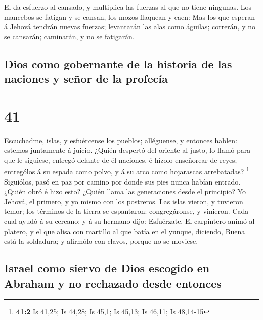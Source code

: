  El da esfuerzo al cansado, y multiplica las fuerzas al que
no tiene ningunas.  Los mancebos se fatigan y se cansan,
los mozos flaquean y caen:  Mas los que esperan á Jehová
tendrán nuevas fuerzas; levantarán las alas como águilas; correrán, y no
se cansarán; caminarán, y no se fatigarán.

\hypertarget{dios-como-gobernante-de-la-historia-de-las-naciones-y-seuxf1or-de-la-profecuxeda}{%
\subsection{Dios como gobernante de la historia de las naciones y señor
de la
profecía}\label{dios-como-gobernante-de-la-historia-de-las-naciones-y-seuxf1or-de-la-profecuxeda}}

\hypertarget{section-40}{%
\section{41}\label{section-40}}

 Escuchadme, islas, y esfuércense los pueblos; alléguense, y
entonces hablen: estemos juntamente á juicio.  ¿Quién
despertó del oriente al justo, lo llamó para que le siguiese, entregó
delante de él naciones, é hízolo enseñorear de reyes; entrególos á su
espada como polvo, y á su arco como hojarascas arrebatadas? \footnote{\textbf{41:2}
  Is 41,25; Is 44,28; Is 45,1; Is 45,13; Is 46,11; Is 48,14-15}
 Siguiólos, pasó en paz por camino por donde sus pies nunca
habían entrado.  ¿Quién obró é hizo esto? ¿Quién llama las
generaciones desde el principio? Yo Jehová, el primero, y yo mismo con
los postreros.  Las islas vieron, y tuvieron temor; los
términos de la tierra se espantaron: congregáronse, y vinieron.
 Cada cual ayudó á su cercano; y á su hermano dijo:
Esfuérzate.  El carpintero animó al platero, y el que alisa
con martillo al que batía en el yunque, diciendo, Buena está la
soldadura; y afirmólo con clavos, porque no se moviese.

\hypertarget{israel-como-siervo-de-dios-escogido-en-abraham-y-no-rechazado-desde-entonces}{%
\subsection{Israel como siervo de Dios escogido en Abraham y no
rechazado desde
entonces}\label{israel-como-siervo-de-dios-escogido-en-abraham-y-no-rechazado-desde-entonces}}

